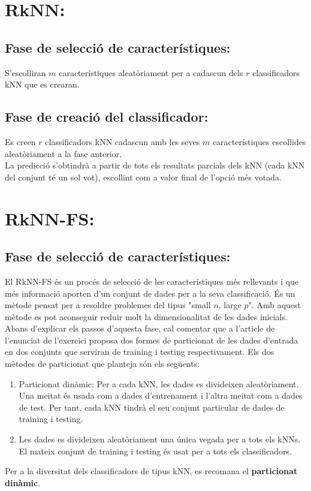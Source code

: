 \documentclass{article} %
\begin{document}
{\color{blue}
	\section*{RkNN:}
	\subsection*{Fase de selecció de característiques:}
	S'escolliran $m$ característiques aleatòriament per a cadascun dels $r$ classificadors kNN que es crearan.

	\subsection*{Fase de creació del classificador:}
	Es creen $r$ classificadors kNN cadascun amb les seves $m$ característiques escollides aleatòriament a la fase anterior. \\

	La predicció s'obtindrà a partir de tots els resultats parcials  dels kNN (cada kNN del conjunt té un sol vot), escollint com a valor final de l'opció més votada.

	\section*{RkNN-FS:}
	\subsection*{Fase de selecció de característiques:}
	El RkNN-FS és un procés de selecció de les característiques més rellevants i que més informació aporten d'un conjunt de dades per a la seva classificació. És un mètode pensat per a resoldre problemes del tipus "small $n$, large $p$". Amb aquest mètode es pot aconseguir reduir molt la dimensionalitat de les dades inicials. \\

	Abans d'explicar els passos d'aquesta fase, cal comentar que a l'article de l'enunciat de l'exercici proposa dos formes de particionat de les dades d'entrada en dos conjunts que serviran de training i testing respectivament. Els dos mètodes de particionat que planteja són els següents:
	\begin{enumerate}
		\item Particionat dinàmic: Per a cada kNN, les dades es divideixen aleatòriament. Una meitat és usada com a dades d'entrenament i l'altra meitat com a dades de test. Per tant, cada kNN tindrà el seu conjunt particular de dades de training i testing.
		\item Les dades es divideixen aleatòriament una única vegada per a tots els kNNs. El mateix conjunt de training i testing és usat per a tots els classificadors.
	\end{enumerate}
	Per a la diversitat dels classificadors de tipus kNN, es recomana el \textbf{particionat dinàmic}. \\

}
\end{document}
